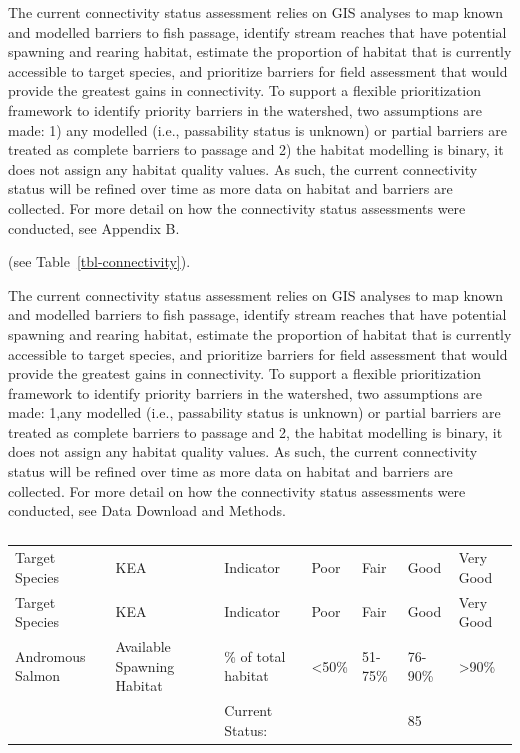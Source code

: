 \documentclass[
  letterpaper,
  DIV=11,
  numbers=noendperiod]{scrreprt}
\begin{document}
The current connectivity status assessment relies on GIS analyses to map
known and modelled barriers to fish passage, identify stream reaches
that have potential spawning and rearing habitat, estimate the
proportion of habitat that is currently accessible to target species,
and prioritize barriers for field assessment that would provide the
greatest gains in connectivity. To support a flexible prioritization
framework to identify priority barriers in the watershed, two
assumptions are made: 1) any modelled (i.e., passability status is
unknown) or partial barriers are treated as complete barriers to passage
and 2) the habitat modelling is binary, it does not assign any habitat
quality values. As such, the current connectivity status will be refined
over time as more data on habitat and barriers are collected. For more
detail on how the connectivity status assessments were conducted, see
Appendix B.

(see Table~\ref{tbl-connectivity}).

The current connectivity status assessment relies on GIS analyses to map
known and modelled barriers to fish passage, identify stream reaches
that have potential spawning and rearing habitat, estimate the
proportion of habitat that is currently accessible to target species,
and prioritize barriers for field assessment that would provide the
greatest gains in connectivity. To support a flexible prioritization
framework to identify priority barriers in the watershed, two
assumptions are made: 1,any modelled (i.e., passability status is
unknown) or partial barriers are treated as complete barriers to passage
and 2, the habitat modelling is binary, it does not assign any habitat
quality values. As such, the current connectivity status will be refined
over time as more data on habitat and barriers are collected. For more
detail on how the connectivity status assessments were conducted, see
Data Download and Methods.

\begin{longtable}[]{@{}lllllll@{}}

\caption{\label{tbl-connectivity}SAMPLE TABLE Connectivity status
assessment for spawning and rearing habitat.}

\tabularnewline

\caption{}\label{T_01924}\tabularnewline
\toprule\noalign{}
Target Species & KEA & Indicator & Poor & Fair & Good & Very Good \\
\midrule\noalign{}
\endfirsthead
\toprule\noalign{}
Target Species & KEA & Indicator & Poor & Fair & Good & Very Good \\
\midrule\noalign{}
\endhead
\bottomrule\noalign{}
\endlastfoot
Andromous Salmon & Available Spawning Habitat & \% of total habitat &
\textless50\% & 51-75\% & 76-90\% & \textgreater90\% \\
& & Current Status: & & & 85 & \\

\end{longtable}
\end{document}
